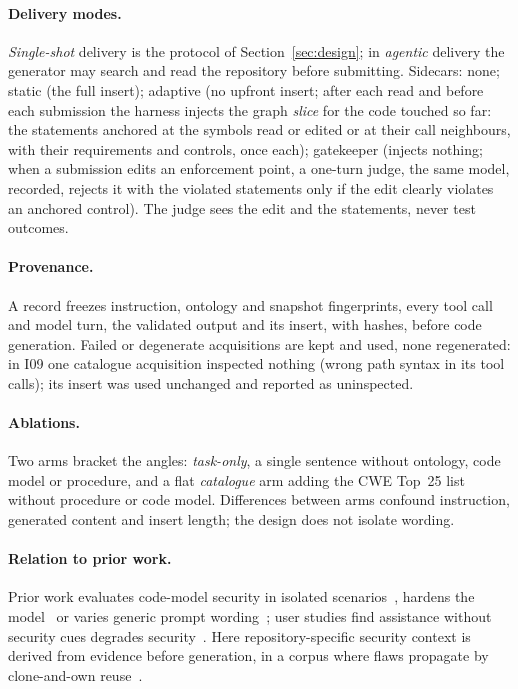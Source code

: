 \paragraph{Delivery modes.}
\emph{Single-shot} delivery is the protocol of Section~\ref{sec:design}; in
\emph{agentic} delivery the generator may search and read the repository
before submitting. Sidecars: none; static (the full insert); adaptive (no upfront insert; after each read and before each
submission the harness injects the graph \emph{slice} for the code touched
so far: the statements anchored at the symbols read or edited or at their
call neighbours, with their requirements and controls, once each);
gatekeeper (injects nothing; when a submission edits an enforcement point, a
one-turn judge, the same model, recorded, rejects it with the violated
statements only if the edit clearly violates an anchored control). The judge
sees the edit and the statements, never test outcomes.

\paragraph{Provenance.}
A record freezes instruction, ontology and snapshot fingerprints, every tool
call and model turn, the validated output and its insert, with hashes, before
code generation. Failed or degenerate acquisitions are kept and
used, none regenerated: in I09 one catalogue acquisition inspected nothing
(wrong path syntax in its tool calls); its insert was used unchanged and
reported as uninspected.

\paragraph{Ablations.}
Two arms bracket the angles: \emph{task-only}, a single sentence without
ontology, code model or procedure, and a flat \emph{catalogue} arm adding the
CWE Top~25 list~\citep{cwetop25} without procedure or code model. Differences
between arms confound instruction, generated content and insert length; the
design does not isolate wording.

\paragraph{Relation to prior work.}
Prior work evaluates code-model security in isolated
scenarios~\citep{pearce2022,siddiq2022,hajipour2024}, hardens the
model~\citep{he2023} or varies generic prompt wording~\citep{tony2025}; user
studies find assistance without security cues degrades
security~\citep{perry2023}. Here repository-specific security context is
derived from evidence before generation, in a corpus where flaws propagate by
clone-and-own reuse~\citep{krueger2018,dubinsky2013}.
